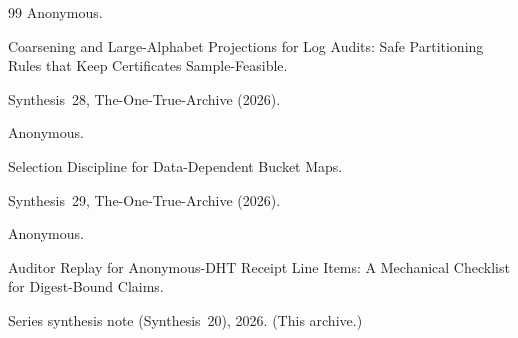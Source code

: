 \documentclass[11pt]{article}
\begin{document}
\begin{thebibliography}{99}
Anonymous.

\newblock Coarsening and Large-Alphabet Projections for Log Audits: Safe Partitioning Rules that Keep Certificates Sample-Feasible.

\newblock Synthesis~28, The-One-True-Archive (2026).

Anonymous.

\newblock Selection Discipline for Data-Dependent Bucket Maps.

\newblock Synthesis~29, The-One-True-Archive (2026).

Anonymous.

\newblock Auditor Replay for Anonymous-DHT Receipt Line Items: A Mechanical Checklist for Digest-Bound Claims.

\newblock Series synthesis note (Synthesis~20), 2026. (This archive.)



\end{thebibliography}
\end{document}
